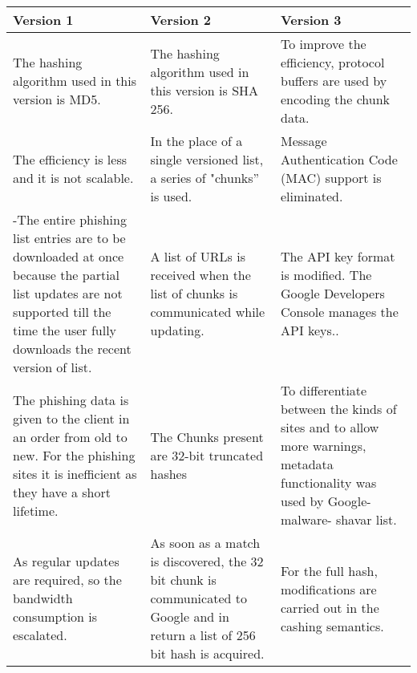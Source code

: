 \begin{singlespace}
	\begin{table}[!h]
		\begin{center}
			\small
			\begin{tabular}{ | m{13em} | m{12.9em} | m{13em} | }
				\hline
				\textbf{Version 1}                     &
				\textbf{Version 2}                     &
				\textbf{Version 3}                                                                                                                 \\
				\hline
				The hashing algorithm used in this
				version is MD5.                        & The hashing algorithm used in this
				version is SHA 256.                    & To improve the efficiency, protocol buffers are
				used by encoding the chunk data.                                                                                                   \\
				\hline
				The efficiency is less and it is not
				scalable.                              & In the place of a single versioned
				list, a series of "chunks” is used.    & Message Authentication Code (MAC) support
				is eliminated.                                                                                                                     \\
				\hline
				-The entire phishing list entries are to be
				downloaded at once because the
				partial list updates are not supported
				till the time the user fully downloads
				the recent version of list.            & A list of URLs is received when the
				list of chunks is communicated
				while updating.                        & The API key format is modified. The Google
				Developers Console manages the API keys..                                                                                          \\
				\hline
				The phishing data is given to the client in
				an order from old to new. For the
				phishing sites it is inefficient as they
				have a short lifetime.                 & The Chunks present are 32-bit
				truncated hashes                       & To differentiate between the kinds of sites and
				to allow more warnings, metadata
				functionality was used by Google-malware-
				shavar list.                                                                                                                       \\
				\hline
				As regular updates are required, so the
				bandwidth consumption is escalated.    & As soon as a match is discovered,
				the 32 bit chunk is
				communicated to Google and in
				return a list of 256 bit hash is
				acquired.                              & For the full hash, modifications are carried out
				in the cashing semantics.                                                                                                          \\
				\hline


\end{tabular}
\end{center}
\end{table}
\end{singlespace}
